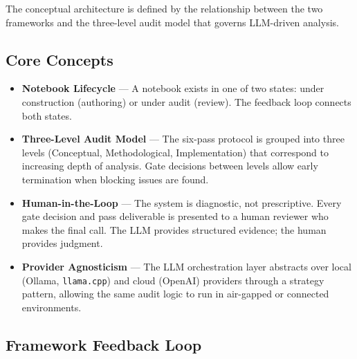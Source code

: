 \documentclass[11pt, a4paper]{article}
\begin{document}
The conceptual architecture is defined by the relationship between the two
frameworks and the three-level audit model that governs LLM-driven analysis.

\subsection*{Core Concepts}

\begin{itemize}
  \item \textbf{Notebook Lifecycle} — A notebook exists in one of two states:
    under construction (authoring) or under audit (review). The feedback loop
    connects both states.

  \item \textbf{Three-Level Audit Model} — The six-pass protocol is grouped
    into three levels (Conceptual, Methodological, Implementation) that
    correspond to increasing depth of analysis. Gate decisions between levels
    allow early termination when blocking issues are found.

  \item \textbf{Human-in-the-Loop} — The system is diagnostic, not
    prescriptive. Every gate decision and pass deliverable is presented to a
    human reviewer who makes the final call. The LLM provides structured
    evidence; the human provides judgment.

  \item \textbf{Provider Agnosticism} — The LLM orchestration layer
    abstracts over local (Ollama, \texttt{llama.cpp}) and cloud (OpenAI)
    providers through a strategy pattern, allowing the same audit logic to
    run in air-gapped or connected environments.
\end{itemize}

\subsection*{Framework Feedback Loop}
\end{document}
